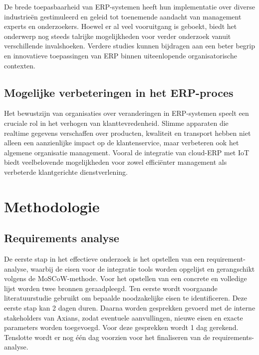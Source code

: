 \vspace{\baselineskip}

De brede toepasbaarheid van ERP-systemen heeft hun implementatie over diverse industrieën gestimuleerd en geleid tot toenemende aandacht van management experts en onderzoekers. Hoewel er al veel vooruitgang is geboekt, biedt het onderwerp nog steeds talrijke mogelijkheden voor verder onderzoek vanuit verschillende invalshoeken. Verdere studies kunnen bijdragen aan een beter begrip en innovatieve toepassingen van ERP binnen uiteenlopende organisatorische contexten. \autocite{sheik2020enterprise}

\subsection{Mogelijke verbeteringen in het ERP-proces}
\label{sec:Mogelijke verbeteringen in het ERP-proces}

Het bewustzijn van organisaties over veranderingen in ERP-systemen speelt een cruciale rol in het verhogen van klanttevredenheid. Slimme apparaten die realtime gegevens verschaffen over producten, kwaliteit en transport hebben niet alleen een aanzienlijke impact op de klantenservice, maar verbeteren ook het algemene organisatie management. Vooral de integratie van cloud-ERP met IoT biedt veelbelovende mogelijkheden voor zowel efficiënter management als verbeterde klantgerichte dienstverlening. \autocite{tavana2020iot}


\section{Methodologie}%
\label{sec:methodologie}

\subsection{Requirements analyse}
\label{sec:Requirements analyse}

De eerste stap in het effectieve onderzoek is het opstellen van een requirement-analyse, waarbij de eisen voor de integratie tools worden opgelijst en gerangschikt volgens de MoSCoW-methode. Voor het opstellen van een concrete en volledige lijst worden twee bronnen geraadpleegd. Ten eerste wordt voorgaande literatuurstudie gebruikt om bepaalde noodzakelijke eisen te identificeren. Deze eerste stap kan 2 dagen duren. Daarna worden gesprekken gevoerd met de interne stakeholders van Axians, zodat eventuele aanvullingen, nieuwe eisen en exacte parameters worden toegevoegd. Voor deze gesprekken wordt 1 dag gerekend. Tenslotte wordt er nog één dag voorzien voor het finaliseren van de requirements-analyse.

